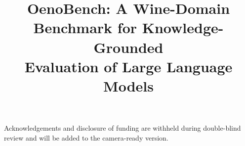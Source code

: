 \documentclass{article}
\title{OenoBench: A Wine-Domain Benchmark for Knowledge-Grounded \\
  Evaluation of Large Language Models}
\begin{document}
\makeatletter
\renewcommand{\@notice}{%
  \thispagestyle{firstpagefooter}%
}
\makeatother
{}
\maketitle










\begin{ack}
Acknowledgements and disclosure of funding are withheld during
double-blind review and will be added to the camera-ready version.
\end{ack}




\appendix







\newpage

\end{document}
